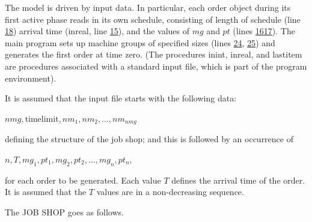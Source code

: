 \documentclass[twoside,11pt]{book}
\begin{document}
The model is driven by input data. In particular, each order object during its first active phase reads in its own schedule, consisting of length of schedule (line \hyperref[pg:program-job-shop-18]{18}) arrival time (inreal, line \hyperref[pg:program-job-shop-15]{15}), and the values of $mg$ and $pt$ (lines \hyperref[pg:program-job-shop-16]{16}\textendash\hyperref[pg:program-job-shop-17]{17}). The main program sets up machine groups of specified sizes (lines \hyperref[pg:program-job-shop-24]{24}, \hyperref[pg:program-job-shop-25]{25}) and generates the first order at time zero. (The procedures inint, inreal, and lastitem are procedures associated with a standard input file, which is part of the program environment).

It is assumed that the input file starts with the following data:

\quad $nmg, \text{timelimit}, nm_1, nm_2, \dots, nm_{nmg}$

\noindent
defining the structure of the job shop; and this is followed by an occurrence of

\quad $n, T, mg_1, pt_1, mg_2, pt_2, \dots, mg_n, pt_n,$

\noindent
for each order to be generated. Each value $T$ defines the arrival time of the order. It is assumed that the $T$ values are in a non-decreasing sequence.

The JOB SHOP goes as follows.
\end{document}
